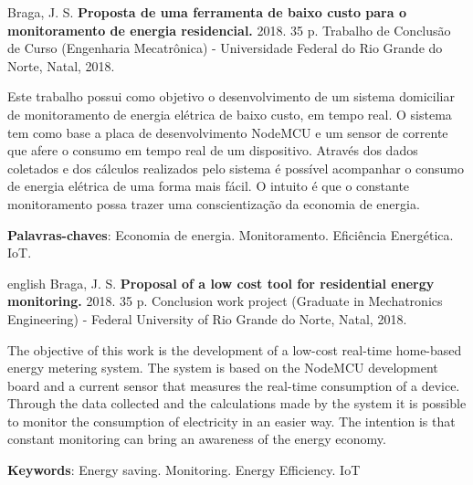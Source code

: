 \setlength{\absparsep}{18pt} %
\begin{resumo}
Braga, J. S. \textbf{Proposta de uma ferramenta de baixo custo para o monitoramento de energia residencial.} 2018. 35 p. Trabalho de Conclusão de Curso
(Engenharia Mecatrônica) - Universidade Federal do Rio Grande do Norte, Natal, 2018.
\vspace*{1cm}


Este trabalho possui como objetivo o desenvolvimento de um sistema domiciliar de monitoramento de energia elétrica de baixo custo, em tempo real.
O sistema tem como base a placa de desenvolvimento NodeMCU e um sensor de corrente que afere o consumo em tempo real de um dispositivo. Através
dos dados coletados e dos cálculos realizados pelo sistema é possível acompanhar o consumo de energia elétrica de uma forma mais fácil.
O intuito é que o constante monitoramento possa trazer uma conscientização da economia de energia.
 
 \noindent
 \textbf{Palavras-chaves}: Economia de energia. Monitoramento. Eficiência Energética. IoT. 
\end{resumo}
\begin{resumo}[Abstract]
	\begin{otherlanguage*}{english}	
Braga, J. S. \textbf{	Proposal of a low cost tool for residential energy monitoring.} 2018. 35 p. Conclusion work project (Graduate in Mechatronics Engineering) - Federal
University of Rio Grande do Norte, Natal, 2018.
\vspace*{1cm}	
	
The objective of this work is the development of a low-cost real-time home-based energy metering system. The system is based on the NodeMCU development board and a current sensor that measures the real-time consumption of a device. Through the data collected and the calculations made by the system it is possible to monitor the consumption of electricity in an easier way. The intention is that constant monitoring can bring an awareness of the energy economy.
	
	\vspace{\onelineskip}
	\noindent 
	\textbf{Keywords}: Energy saving. Monitoring. Energy Efficiency. IoT
	\end{otherlanguage*}
\end{resumo}